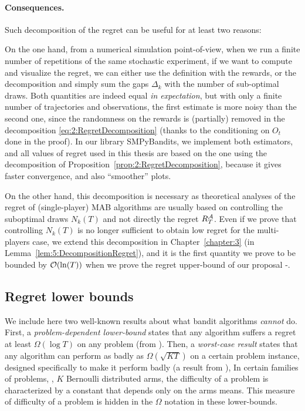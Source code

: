 \paragraph{Consequences.}
%
Such decomposition of the regret can be useful for at least two reasons:

On the one hand, from a numerical simulation point-of-view, when we run a finite number of repetitions of the same stochastic experiment, if we want to compute and visualize the regret, we can either use the definition with the rewards, or the decomposition and simply sum the gaps $\Delta_k$ with the number of sub-optimal draws.
Both quantities are indeed equal \emph{in expectation}, but with only a finite number of trajectories and observations, the first estimate is more noisy than the second one, since the randomness on the rewards is (partially) removed in the decomposition \eqref{eq:2:RegretDecomposition} (thanks to the conditioning on $O_t$ done in the proof).
In our library SMPyBandits, we implement both estimators, and all values of regret used in this thesis are based on the one using the decomposition of Proposition~\ref{prop:2:RegretDecomposition}, because it gives faster convergence, and also ``smoother'' plots.
\label{remark:2:moreAccurateCountofRegretForSimulations}

On the other hand, this decomposition is necessary as theoretical analyses of the regret of (single-player) MAB algorithms are usually based on controlling the suboptimal draws $N_k(T)$ and not directly the regret $R_T^{\mathcal{A}}$.
Even if we prove that controlling $N_k(T)$ is no longer sufficient to obtain low regret for the multi-players case, we extend this decomposition in Chapter~\ref{chapter:3} (in Lemma~\ref{lem:5:DecompositionRegret}), and it is the first quantity we prove to be bounded by $\mathop{}\mathopen{}\mathcal{O}\mathopen{}\left(\ln(T)\right)$ when we prove the regret upper-bound of our proposal \MCTopM-\klUCB.


\subsection{Regret lower bounds}

We include here two well-known results about what bandit algorithms \emph{cannot} do.
First, a \emph{problem-dependent lower-bound} states that any algorithm suffers a regret at least $\Omega(\log T)$ on any problem (from \cite{LaiRobbins85}).
Then, a \emph{worst-case result} states that any algorithm can perform as badly as $\Omega(\sqrt{K T})$ on a certain problem instance, designed specifically to make it perform badly (a result from \cite{Auer02NonStochastic}),
%
In certain families of problems, \eg, $K$ Bernoulli distributed arms, the difficulty of a problem is characterized by a constant that depends only on the arms means. This measure of difficulty of a problem is hidden in the $\Omega$ notation in these lower-bounds.

